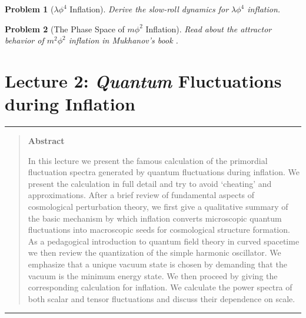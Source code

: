 \documentclass[12pt,letterpaper,rotate]{article}
\newtheorem{thm}{Exercise}
\newtheorem{thmP}{Problem}
\begin{document}
{%

\begin{thmP}[$\lambda \phi^4$ Inflation]\label{pro:case}
Derive the slow-roll dynamics for $\lambda \phi^4$ inflation.
\end{thmP}


\begin{thmP}[The Phase Space of $m \phi^2$ Inflation]\label{pro:case2}
Read about the attractor behavior of $m^2 \phi^2$ inflation in Mukhanov's book \cite{Mukhanov}.
\end{thmP}


\newpage


\part{Lecture 2: {\sl Quantum} Fluctuations during Inflation}


\vspace{0.5cm}
 \hrule \vspace{0.3cm}
\begin{quote}
{\bf Abstract}

\noindent
In this lecture we present the famous calculation of the primordial fluctuation spectra generated by quantum fluctuations during inflation.
We present the calculation in full detail and try to avoid `cheating' and approximations.
After a brief review of fundamental aspects of cosmological perturbation theory, we first give a qualitative summary of the basic mechanism by which inflation converts microscopic quantum fluctuations into macroscopic seeds for cosmological  structure formation.
As a pedagogical introduction to quantum field theory in curved spacetime we then review the quantization of the simple harmonic oscillator. We emphasize that a unique vacuum state is chosen by demanding that the vacuum is the minimum energy state.
We then proceed by giving the corresponding calculation for inflation.
We calculate the power spectra of both scalar and tensor fluctuations and discuss their dependence on scale.

\end{quote}
\vspace{0.1cm}  \hrule
 \vspace{1.5cm}



}
\end{document}
